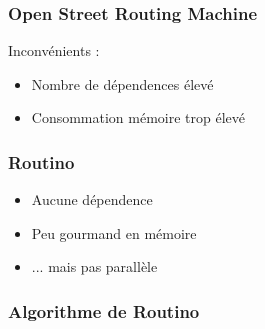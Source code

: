 \begin{frame}
\frametitle{Open Street Routing Machine}
Inconvénients :
\begin{itemize}
\item Nombre de dépendences élevé
\item Consommation mémoire trop élevé
\end{itemize}
\end{frame}


\begin{frame}
\frametitle{Routino}
\begin{itemize}
\item Aucune dépendence
\item Peu gourmand en mémoire
\item ... mais pas parallèle
\end{itemize}
\end{frame}



\begin{frame}
\frametitle{Algorithme de Routino}
\begin{itemize}
\end{itemize}
\end{frame}
